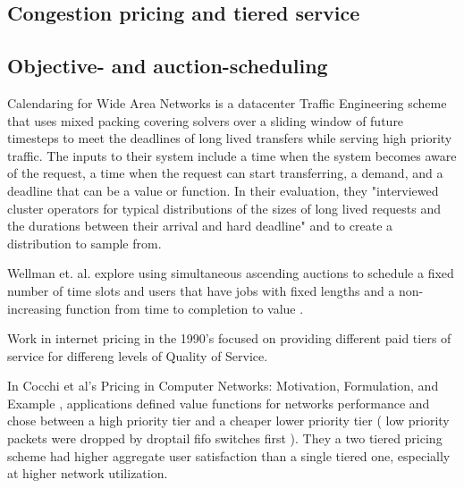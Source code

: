 \subsection{Congestion pricing and tiered service}

\subsection{Objective- and auction-scheduling}

Calendaring for Wide Area Networks \cite{tempus14}
is a datacenter Traffic Engineering scheme that uses mixed packing covering solvers over a sliding window of future timesteps to meet the deadlines of long lived transfers while serving high priority traffic.
The inputs to their system include a time when the system becomes aware of the request, a time when the request can start transferring, a demand, and a deadline that can be a value or function.
In their evaluation, they "interviewed cluster operators for typical
distributions of the sizes of long lived requests and the durations
between their arrival and hard deadline" and to create a distribution
to sample from.

Wellman et. al. explore using simultaneous ascending auctions to schedule a fixed number of time slots and users that have jobs with fixed lengths and a non-increasing function from time to completion to value \cite{wellman01, wellman05}.





Work in internet pricing in the 1990's focused on providing different paid tiers of service for differeng levels of Quality of Service.

In Cocchi et al's Pricing in Computer Networks: Motivation, Formulation, and Example \cite{cocchi93}, applications defined value functions for networks performance and chose between a high priority tier and a cheaper lower priority tier ( low priority packets were dropped by droptail fifo switches first ). They a two tiered pricing scheme had higher aggregate user satisfaction than a single tiered one, especially at higher network utilization.

